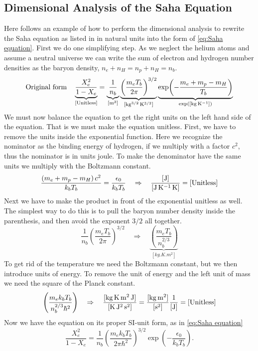 \documentclass[10pt,a4paper]{article}
\begin{document}
\clearpage
\begin{appendices}
    \appendix

    \section{Dimensional Analysis of the Saha Equation}
    \label{asec:Dimensional analysis}
    Here follows an example of how to perform the dimensional analysis to rewrite the Saha equation as listed in \cite[p. 70]{Dodelson} in natural units into the form of \cref{eq:Saha equation}. First we do one simplifying step. As we neglect the helium atoms and assume a neutral universe we can write the sum of electron and hydrogen number densities as the baryon density, $n_e + n_H = n_p + n_H = n_b$.
    \begin{equation*}
        \text{Original form} \quad 
        \underbrace{\frac{X_e^2}{1-X_e}}_{\rm{[Unitless]}} = \underbrace{\frac{1}{n_b}}_{[\si{m^3}]}\underbrace{\left(\frac{m_e T_b}{2\pi}\right)^{3/2}}_{[\si{kg^{3/2}.K^{3/2}}]} \underbrace{\exp(-\frac{m_e+m_p-m_H}{T_b})}_{\exp([\si{kg.K^{-1}}])}
    \end{equation*}
    We must now balance the equation to get the right units on the left hand side of the equation. That is we must make the equation unitless. First, we have to remove the units inside the exponential function. Here we recognize the nominator as the binding energy of hydrogen, if we multiply with a factor $c^2$, thus the nominator is in units joule. To make the denominator have the same units we multiply with the Boltzmann constant.
    \begin{equation*}
        \frac{\left(m_e+m_p-m_H\right)c^2}{k_b T_b} = \frac{\epsilon_0}{k_b T_b} \quad \Rightarrow \quad \frac{[\si{J}]}{[\si{J.K^{-1}.K}]} = [\rm{Unitless}]
    \end{equation*}
    Next we have to make the product in front of the exponential unitless as well. The simplest way to do this is to pull the baryon number density inside the parenthesis, and then avoid the exponent $3/2$ all together.
    \begin{equation*}
        \frac{1}{n_b}\left(\frac{m_eT_b}{2\pi}\right)^{3/2} \quad \Rightarrow \quad \underbrace{\left(\frac{m_e T_b}{n_b^{2/3}}\right)}_{[\si{kg.K.m^2}]}
    \end{equation*}
    To get rid of the temperature we need the Boltzmann constant, but we then introduce units of energy. To remove the unit of energy and the left unit of mass we need the square of the Planck constant.
    \begin{equation*}
        \left(\frac{m_e k_b T_b}{n_b^{2/3}\hbar^2}\right) \quad \Rightarrow \quad \frac{[\si{kg.K.m^2.J}]}{[\si{K.J^2.s^2}]} = \frac{[\si{kg.m^2}]}{[\si{s^2}]}\frac{1}{[\si{J}]} = [\rm{Unitless}]
    \end{equation*}
    Now we have the equation on its proper SI-unit form, as in \cref{eq:Saha equation}
    \begin{equation*}
        \frac{X_e^2}{1-X_e} = \frac{1}{n_b}\left(\frac{m_e k_b T_b}{2\pi \hbar^2}\right)^{3/2} \exp(-\frac{\epsilon_0}{k_b T_b}).
    \end{equation*}

\end{appendices}
\end{document}

